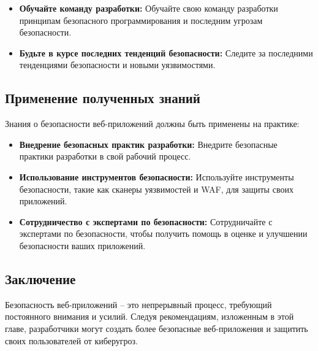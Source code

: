 \documentclass[a4paper,12pt]{diplom}
\begin{document}
	 \begin{itemize}
	 	\item \textbf{Обучайте команду разработки:} Обучайте свою команду разработки принципам безопасного программирования и последним угрозам безопасности.
	 	\item \textbf{Будьте в курсе последних тенденций безопасности:} Следите за последними тенденциями безопасности и новыми уязвимостями.
	 \end{itemize}
	 
	 \subsection{Применение полученных знаний}
	 
	 Знания о безопасности веб-приложений должны быть применены на практике:
	 
	 \begin{itemize}
	 	\item \textbf{Внедрение безопасных практик разработки:}  Внедрите безопасные практики разработки в свой рабочий процесс.
	 	\item \textbf{Использование инструментов безопасности:}  Используйте инструменты безопасности, такие как сканеры уязвимостей и WAF, для защиты своих приложений.
	 	\item \textbf{Сотрудничество с экспертами по безопасности:}  Сотрудничайте с экспертами по безопасности, чтобы получить помощь в оценке и улучшении безопасности ваших приложений.
	 \end{itemize}
	 
	 \subsection{Заключение}
	 
	 Безопасность веб-приложений – это непрерывный процесс, требующий постоянного внимания и усилий.  Следуя рекомендациям, изложенным в этой главе, разработчики могут создать более безопасные веб-приложения и защитить своих пользователей от киберугроз.
	 
	 
	 
	 
	 
	 
	 
	 
	 
	 
	 
	 
	
	
	
	
	
	
	
	
	
	
	
	
	
	
	
	\renewcommand\bibname{Список литературы}
	
	
	
	
	
\end{document}
